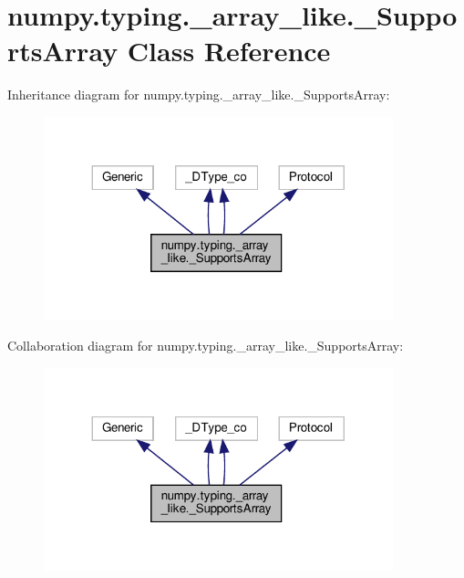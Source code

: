\hypertarget{classnumpy_1_1typing_1_1__array__like_1_1__SupportsArray}{}\section{numpy.\+typing.\+\_\+array\+\_\+like.\+\_\+\+Supports\+Array Class Reference}
\label{classnumpy_1_1typing_1_1__array__like_1_1__SupportsArray}


Inheritance diagram for numpy.\+typing.\+\_\+array\+\_\+like.\+\_\+\+Supports\+Array\+:
\nopagebreak
\begin{figure}[H]
\begin{center}
\leavevmode
\includegraphics[width=287pt]{classnumpy_1_1typing_1_1__array__like_1_1__SupportsArray__inherit__graph}
\end{center}
\end{figure}


Collaboration diagram for numpy.\+typing.\+\_\+array\+\_\+like.\+\_\+\+Supports\+Array\+:
\nopagebreak
\begin{figure}[H]
\begin{center}
\leavevmode
\includegraphics[width=287pt]{classnumpy_1_1typing_1_1__array__like_1_1__SupportsArray__coll__graph}
\end{center}
\end{figure}
